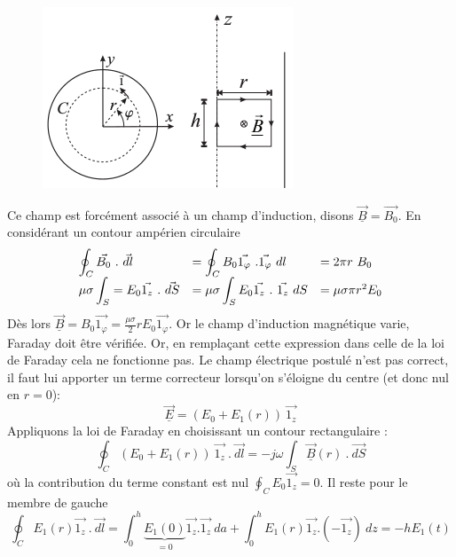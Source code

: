 	\begin{figure}
	\vspace{-5mm}
	\includegraphics[scale=0.45]{ch3/image1.png}
	\end{figure}
Ce champ est forcément associé à un champ d'induction, disons $\vec{\underline{B}}=\vec{B_0}$. 
En considérant un contour ampérien circulaire
\begin{equation}
\begin{array}{lll}
\DS \oint_C \vec{B_0}\ .\ \vec{dl} &=\DS \oint_C B_0\vec{1_\varphi}\ . \vec{1_\varphi}\ dl &= 2\pi 
r\ B_0\\
\DS\mu\sigma\int_S = E_0\vec{1_z}\ .\ \vec{dS} &=\DS \mu\sigma\int_S E_0\vec{1_z}\ .\ \vec{1_z}\ dS 
&= \mu\sigma \pi r^2 E_0
\end{array}
\end{equation}
Dès lors $\vec{\underline{B}} = B_0\vec{1_\varphi} = \frac{\mu\sigma}{2}rE_0\vec{1_\varphi}$. Or 
le champ d'induction magnétique varie, Faraday doit être vérifiée. Or, en remplaçant cette 
expression dans celle de la loi de Faraday cela ne fonctionne pas. Le champ électrique postulé 
n'est pas correct, il faut lui apporter un terme correcteur lorsqu'on s'éloigne du centre (et 
donc nul en $r=0$):
\begin{equation}
\vec{\underline{E}} = (E_0+E_1(r))\ \vec{1_z}
\end{equation}
Appliquons la loi de Faraday en choisissant un contour rectangulaire :
\begin{equation}
\oint_C (E_0+E_1(r))\ \vec{1_z}\ .\ \vec{dl} = -j\omega\int_S\underline{\vec{B}}(r)\ .\ \vec{dS}
\end{equation}
où la contribution du terme constant est nul $\oint_C E_0\vec{1_z}=0$. Il reste pour le membre de
gauche
\begin{equation}
\oint_C E_1(r)\vec{1_z}\ .\ \vec{dl} = \int_0^h \underbrace{E_1(0)}_{=0}\vec{1_z}.\vec{1_z}\ da +
\int_0^h E_1(r)\vec{1_z}.(-\vec{1_z})\ dz = -hE_1(t)
\end{equation}

